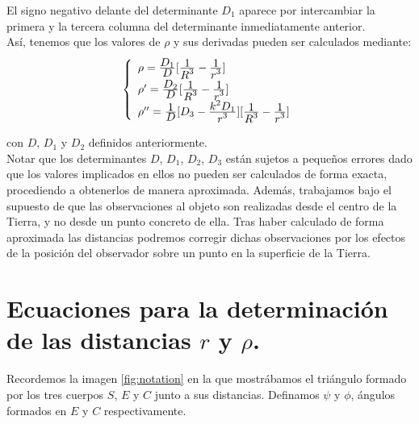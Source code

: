 \documentclass[11pt]{book}
\newcommand\ddfrac[2]{\frac{\displaystyle #1}{\displaystyle #2}}
\begin{document}
El signo negativo delante del determinante $D_1$ aparece por intercambiar la primera y la tercera columna del determinante inmediatamente anterior.\\

Así, tenemos que los valores de $\rho$ y sus derivadas pueden ser calculados mediante:
\begin{align}
\left\{
\def\arraystretch{1.5}
\begin{array}{l}
	\rho   = \ddfrac{D_1}{D}[\ddfrac{1}{R^3}-\ddfrac{1}{r^3}]\\
	\rho'  = \ddfrac{D_2}{D}[\ddfrac{1}{R^3}-\ddfrac{1}{r^3}]\\
	\rho'' = \ddfrac{1}{D}[D_3-\ddfrac{k^2D_1}{r^3}][\ddfrac{1}{R^3}-\ddfrac{1}{r^3}]
\end{array}
\right.
\label{eq:rho_values}
\end{align}

\noindent con $D$, $D_1$ y $D_2$ definidos anteriormente.\\

Notar que los determinantes $D$, $D_1$, $D_2$, $D_3$ están sujetos a pequeños errores dado que los valores implicados en ellos no pueden ser calculados de forma exacta, procediendo a obtenerlos de manera aproximada. Además, trabajamos bajo el supuesto de que las observaciones al objeto son realizadas desde el centro de la Tierra, y no desde un punto concreto de ella. Tras haber calculado de forma aproximada las distancias podremos corregir dichas observaciones por los efectos de la posición del observador sobre un punto en la superficie de la Tierra.\\


\section{Ecuaciones para la determinación de las distancias $r$ y $\rho$.}
\label{sec:distancias_r_rho}
Recordemos la imagen \ref{fig:notation} en la que mostrábamos el triángulo formado por los tres cuerpos $S$, $E$ y $C$ junto a sus distancias. Definamos $\psi$ y $\phi$, ángulos formados en $E$ y $C$ respectivamente.
\end{document}
